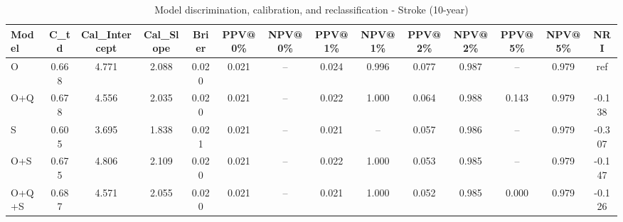 \begin{table}[htbp]
\centering
\small
\caption{Model discrimination, calibration, and reclassification - Stroke (10-year)}
\label{tab:perf_stroke_10y}
\begin{tabular}{lccccccccccccc}
\toprule
Model & C\_td & Cal\_Intercept & Cal\_Slope & Brier & PPV@0\% & NPV@0\% & PPV@1\% & NPV@1\% & PPV@2\% & NPV@2\% & PPV@5\% & NPV@5\% & NRI \\
\midrule
O & 0.668 & 4.771 & 2.088 & 0.020 & 0.021 & -- & 0.024 & 0.996 & 0.077 & 0.987 & -- & 0.979 & ref \\
O+Q & 0.678 & 4.556 & 2.035 & 0.020 & 0.021 & -- & 0.022 & 1.000 & 0.064 & 0.988 & 0.143 & 0.979 & -0.138 \\
S & 0.605 & 3.695 & 1.838 & 0.021 & 0.021 & -- & 0.021 & -- & 0.057 & 0.986 & -- & 0.979 & -0.307 \\
O+S & 0.675 & 4.806 & 2.109 & 0.020 & 0.021 & -- & 0.022 & 1.000 & 0.053 & 0.985 & -- & 0.979 & -0.147 \\
O+Q+S & 0.687 & 4.571 & 2.055 & 0.020 & 0.021 & -- & 0.021 & 1.000 & 0.052 & 0.985 & 0.000 & 0.979 & -0.126 \\
\bottomrule
\end{tabular}
\end{table}